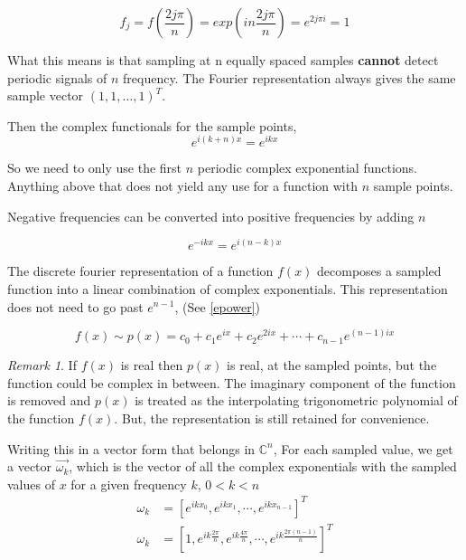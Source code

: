 \documentclass[11pt]{amsart}
\theoremstyle{definition}
\theoremstyle{remark}
\newtheorem{rem}[thm]{Remark}
\numberwithin{equation}{section}
\begin{document}
\[
	f_j = f(\frac{2j \pi}{n}) = exp(in \frac{2j\pi}{n}) = e^{2j\pi i} = 1
\]

What this means is that sampling at n equally spaced samples \textbf{cannot} detect periodic signals of $n$ frequency. The Fourier representation always gives the same sample vector $(1,1,\dots, 1)^T$. 

Then the complex functionals for the sample points,
\begin{equation}
\label{epower} e^{i(k+n)x} = e^{ikx}
\end{equation}



So we need to only use the first $n$ periodic complex exponential functions. Anything above that does not yield any use for a function with $n$ sample points.

Negative frequencies can be converted into positive frequencies by adding $n$

\begin{equation}
	e^{-ikx} = e^{i(n-k)x} \label{negativefreq}
\end{equation}

The discrete fourier representation of a function $f(x)$ decomposes a sampled function into a linear combination of complex exponentials. This representation does not need to go past $e^{n-1}$, (See \ref{epower})

\begin{equation}
	f(x) \sim p(x) = c_0 + c_1 e^{ix} + c_2 e^{2ix} + \cdots + c_{n-1}e^{(n-1)ix}
	\label{repcomp}
\end{equation}
\begin{rem}
	If $f(x)$ is real then $p(x)$ is real, at the sampled points, but the function could be complex in between. The imaginary component of the function is removed and $p(x)$ is treated as the interpolating trigonometric polynomial of the function $f(x)$. But, the representation is still retained for convenience.
\end{rem}

Writing this in a vector form that belongs in $\mathbb{C}^n$, For each sampled value, we get a vector $\vec{\omega_k}$, which is the vector of all the complex exponentials with the sampled values of $x$ for a given frequency $k$, $0 < k < n$
\begin{align*}
	\omega_k &= [e^{i k x_0},e^{ik x_1},\cdots,e^{ik x_{n-1}}]^T \\
	\omega_k &= [1,e^{i k \frac{2\pi}{n}},e^{ik \frac{4\pi}{n}},\cdots,e^{ik \frac{2\pi(n-1)}{n}}]^T \\
\end{align*}
\end{document}
